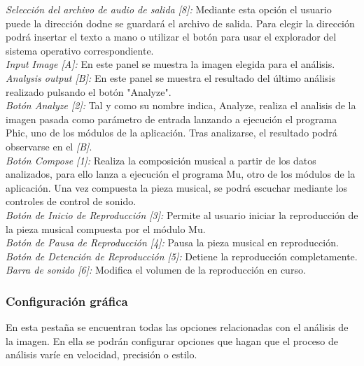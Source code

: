 		\noindent\textit{Selección del archivo de audio de salida [8]:}  Mediante esta opción el usuario puede la dirección dodne se guardará el archivo de salida. Para elegir la dirección podrá insertar el texto a mano o utilizar el botón para usar el explorador del sistema operativo correspondiente.\\
		
		\noindent\textit{Input Image [A]:} En este panel se muestra la imagen elegida para el análisis.\\
		
		\noindent\textit{Analysis output [B]:} En este panel se muestra el resultado del último análisis realizado pulsando el botón "Analyze".\\
		
		\noindent\textit{Botón Analyze [2]:} Tal y como su nombre indica, Analyze, realiza el analisis de la imagen pasada como parámetro de entrada lanzando a ejecución el programa Phic, uno de los módulos de la aplicación. Tras analizarse, el resultado podrá observarse en el \textit{[B]}.\\
		
		\noindent\textit{Botón Compose [1]:} Realiza la composición musical a partir de los datos analizados, para ello lanza a ejecución el programa Mu, otro de los módulos de la aplicación. Una vez compuesta la pieza musical, se podrá escuchar mediante los controles de control de sonido.\\
		
		\noindent\textit{Botón de Inicio de Reproducción [3]:} Permite al usuario iniciar la reproducción de la pieza musical compuesta por el módulo Mu.\\
		
		\noindent\textit{Botón de Pausa de Reproducción [4]:} Pausa la pieza musical en reproducción.\\
		
		\noindent\textit{Botón de Detención de Reproducción [5]:} Detiene la reproducción completamente.\\
		
		\noindent\textit{Barra de sonido [6]:} Modifica el volumen de la reproducción en curso.

		
		\subsubsection{Configuración gráfica}
		
		En esta pestaña se encuentran todas las opciones relacionadas con el análisis de la imagen. En ella se podrán configurar opciones que hagan que el proceso de análisis varíe en velocidad, precisión o estilo.\\
		
